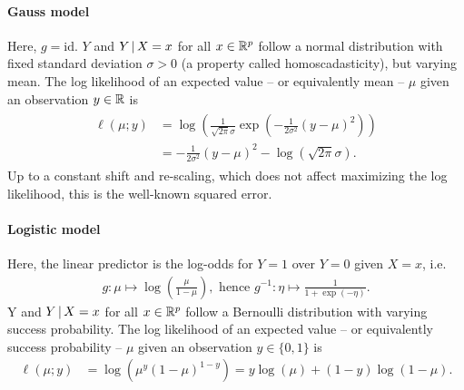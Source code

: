 \paragraph{Gauss model}
Here, $g = \text{id}$. $Y$ and $Y \,|\, X = x$ for all $x \in \mathbb{R}^p$ follow a normal
distribution with fixed standard deviation $\sigma > 0$ (a property called homoscadasticity), but 
varying mean. The log likelihood of an expected value -- or equivalently mean -- $\mu$ given an 
observation $y \in \mathbb{R}$ is
\begin{align}
\begin{split}
    \ell(\mu; y) &= \log\left( \frac{1}{\sqrt{2\pi}\sigma} 
        \exp \left( -\frac{1}{2\sigma^2}(y - \mu)^2 \right) \right) \\
    &= -\frac{1}{2\sigma^2}(y - \mu)^2 - \log \left( \sqrt{2\pi}\sigma \right).
\end{split}
\end{align}
Up to a constant shift and re-scaling, which does not affect maximizing the log likelihood, this
is the well-known squared error.

\paragraph{Logistic model}
Here, the linear predictor is the log-odds for $Y = 1$ over $Y = 0$ given $X = x$, i.e.
\begin{align}
    g: \mu \mapsto \log\left( \frac{\mu}{1 - \mu} \right), \text{ hence } g^{-1}: \eta \mapsto
    \frac{1}{1 + \exp(-\eta)}.
\end{align}
Y and $Y \,|\, X = x$ for all $x \in \mathbb{R}^p$ follow a Bernoulli distribution with varying success 
probability. The log likelihood of an expected value -- or equivalently success probability -- 
$\mu$ given an observation $y \in \{0, 1\}$ is
\begin{align}
    \ell(\mu; y) &= \log\left( \mu^{y} (1 - \mu)^{1 - y} \right) 
    = y \log(\mu) + (1 - y) \log(1 - \mu). 
\end{align}

